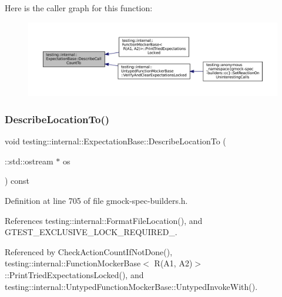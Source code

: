Here is the caller graph for this function\+:
\nopagebreak
\begin{figure}[H]
\begin{center}
\leavevmode
\includegraphics[width=350pt]{classtesting_1_1internal_1_1ExpectationBase_a2beebed3ade29077bcf294b449bb8b9d_icgraph}
\end{center}
\end{figure}
\mbox{\label{classtesting_1_1internal_1_1ExpectationBase_a666e7f8fb2412e78f090244e6bfd4493}} 
\subsubsection{\texorpdfstring{Describe\+Location\+To()}{DescribeLocationTo()}}
{\footnotesize\ttfamily void testing\+::internal\+::\+Expectation\+Base\+::\+Describe\+Location\+To (\begin{DoxyParamCaption}\item[{\+::std\+::ostream $\ast$}]{os }\end{DoxyParamCaption}) const\hspace{0.3cm}{\ttfamily [inline]}}



Definition at line 705 of file gmock-\/spec-\/builders.\+h.



References testing\+::internal\+::\+Format\+File\+Location(), and G\+T\+E\+S\+T\+\_\+\+E\+X\+C\+L\+U\+S\+I\+V\+E\+\_\+\+L\+O\+C\+K\+\_\+\+R\+E\+Q\+U\+I\+R\+E\+D\+\_\+.



Referenced by Check\+Action\+Count\+If\+Not\+Done(), testing\+::internal\+::\+Function\+Mocker\+Base$<$ R(\+A1, A2)$>$\+::\+Print\+Tried\+Expectations\+Locked(), and testing\+::internal\+::\+Untyped\+Function\+Mocker\+Base\+::\+Untyped\+Invoke\+With().


